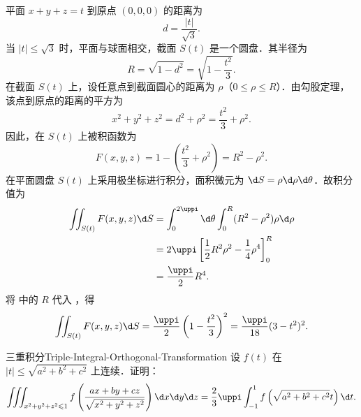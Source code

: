 \begin{myproof}
    平面 $x + y + z = t$ 到原点 $(0, 0, 0)$ 的距离为
    \begin{equation}
        \label{eq:distance-2}
        d = \frac{|t|}{\sqrt{3}}.
    \end{equation}
    当 $|t| \le \sqrt{3}$ 时，平面与球面相交，截面 $S(t)$ 是一个圆盘．其半径为
    \begin{equation}
        \label{eq:radius-2}
        R = \sqrt{1 - d^2} = \sqrt{1 - \frac{t^2}{3}}.
    \end{equation}
    在截面 $S(t)$ 上，设任意点到截面圆心的距离为 $\rho$（$0 \le \rho \le R$）．由勾股定理，该点到原点的距离的平方为
    \begin{equation}
        \label{eq:dist-sq-2}
        x^2 + y^2 + z^2 = d^2 + \rho^2 = \frac{t^2}{3} + \rho^2.
    \end{equation}
    因此，在 $S(t)$ 上被积函数为
    \begin{equation}
        \label{eq:integrand-2}
        F(x, y, z) = 1 - \left( \frac{t^2}{3} + \rho^2 \right) = R^2 - \rho^2.
    \end{equation}
    在平面圆盘 $S(t)$ 上采用极坐标进行积分，面积微元为 $\d S = \rho \d \rho \d \theta$．故积分值为
    \begin{equation}
        \label{eq:calc-integral-2}
        \begin{aligned}
            \iint_{S(t)} F(x, y, z) \d S & = \int_{0}^{2\uppi} \d \theta \int_{0}^{R} (R^2 - \rho^2) \rho \d \rho       \\
                                         & = 2 \uppi \left[ \frac{1}{2} R^2 \rho^2 - \frac{1}{4} \rho^4 \right]_{0}^{R} \\
                                         & = \frac{\uppi}{2} R^4.
        \end{aligned}
    \end{equation}
    将  中的 $R$ 代入 ，得
    \begin{equation}
        \iint_{S(t)} F(x, y, z) \d S = \frac{\uppi}{2} \left( 1 - \frac{t^2}{3} \right)^2 = \frac{\uppi}{18} (3 - t^2)^2.
    \end{equation}
\end{myproof}

\begin{problem}{三重积分}{Triple-Integral-Orthogonal-Transformation}
    设 $f(t)$ 在 $|t| \leqslant \sqrt{a^2 + b^2 + c^2}$ 上连续．证明：
    \begin{equation}
        \iiint_{x^2+y^2+z^2 \leqslant 1} f\left( \frac{ax + by + cz}{\sqrt{x^2 + y^2 + z^2}} \right) \d x \d y \d z = \frac{2}{3} \uppi \int_{-1}^{1} f\left( \sqrt{a^2 + b^2 + c^2} t \right) \d t.
    \end{equation}
\end{problem}

